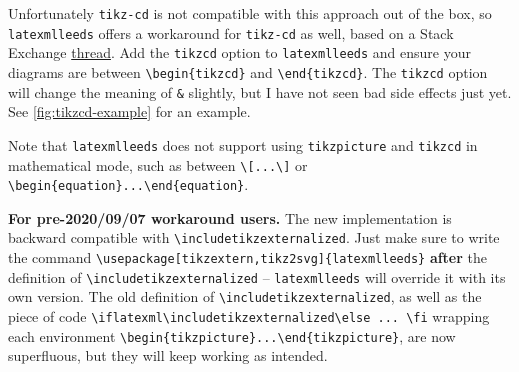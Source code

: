 \documentclass[a4paper]{article}
\def\ltxinline{\lstinline[style=latexml,frame=none]}
\theoremstyle{definition}
\begin{document}
Unfortunately \verb|tikz-cd| is not compatible with this approach out of the box, so \verb|latexmlleeds| offers a workaround for \verb|tikz-cd| as well, based on a Stack Exchange \href{https://tex.stackexchange.com/questions/171931/are-the-tikz-libraries-cd-and-external-incompatible-with-one-another#362104}{thread}. Add the \verb|tikzcd| option to \verb|latexmlleeds| and ensure your diagrams are between \ltxinline|\begin{tikzcd}| and \ltxinline|\end{tikzcd}|. The \verb|tikzcd| option will change the meaning of \ltxinline|&| slightly, but I have not seen bad side effects just yet. See \autoref{fig:tikzcd-example} for an example.

Note that \verb|latexmlleeds| does not support using \verb|tikzpicture| and \verb|tikzcd| in mathematical mode, such as between \ltxinline|\[...\]| or \ltxinline|\begin{equation}...\end{equation}|.

\textbf{For pre-2020/09/07 workaround users.} The new implementation is backward compatible with \ltxinline|\includetikzexternalized|. Just make sure to write the command \ltxinline|\usepackage[tikzextern,tikz2svg]{latexmlleeds}| \textbf{after} the definition of \ltxinline|\includetikzexternalized| -- \verb|latexmlleeds| will override it with its own version. The old definition of \ltxinline|\includetikzexternalized|, as well as the piece of code \ltxinline|\iflatexml\includetikzexternalized\else ... \fi| wrapping each environment \ltxinline|\begin{tikzpicture}...\end{tikzpicture}|, are now superfluous, but they will keep working as intended.
\end{document}

